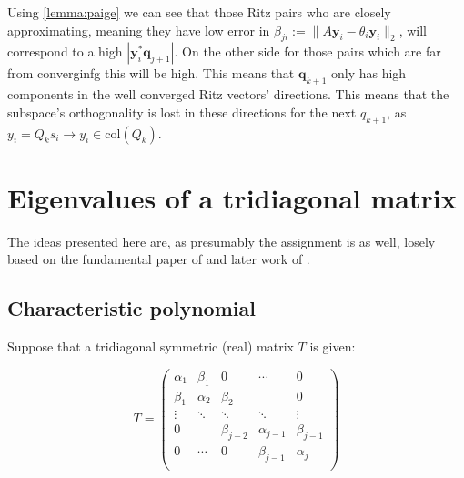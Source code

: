 \documentclass{article}
\begin{document}
Using \autoref{lemma:paige} we can see that those Ritz pairs who are closely approximating, meaning they have low error in $\beta_{ji} := \|A\textbf{y}_i - \theta_i \textbf{y}_i\|_2$, will correspond to a high $\left|\textbf{y}_i^{\ast}\textbf{q}_{j+1}\right|$. On the other side for those pairs which are far from converginfg this will be high. This means that $\textbf{q}_{k+1}$ only has high components in the well converged Ritz vectors' directions. This means that the subspace's orthogonality is lost in these directions for the next $q_{k+1}$, as $y_i = Q_k s_i \rightarrow y_i \in \mathrm{col}\left(Q_k\right)$.

\section{Eigenvalues of a tridiagonal matrix}
The ideas presented here are, as presumably the assignment is as well, losely based on the fundamental paper of \textcite{givens-eig} and later work of \textcite{sturm-ortega1960}.
\subsection{Characteristic polynomial}
Suppose that a tridiagonal symmetric (real) matrix $T$ is given:

$$T=\begin{pmatrix}
	\alpha_1&\beta_1&0&\cdots&0\\
	\beta_1&\alpha_2&\beta_2&&0\\
	\vdots&\ddots&\ddots&\ddots&\vdots\\
	0&&\beta_{j-2}&\alpha_{j-1}&\beta_{j-1}\\
	0&\cdots&0&\beta_{j-1}&\alpha_{j}\\
\end{pmatrix}$$
\end{document}

